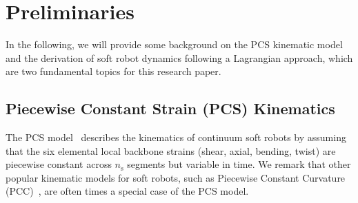 \section{Preliminaries}
In the following, we will provide some background on the \gls{PCS} kinematic model and the derivation of soft robot dynamics following a Lagrangian approach, which are two fundamental topics for this research paper.

\subsection{Piecewise Constant Strain (PCS) Kinematics}\label{sec:pcsregression:pcs_model}
The \gls{PCS} model~\citep{renda2018discrete} describes the kinematics of continuum soft robots by assuming that the six elemental local backbone strains (shear, axial, bending, twist) are piecewise constant across $n_\mathrm{s}$ segments but variable in time.
We remark that other popular kinematic models for soft robots, such as Piecewise Constant Curvature (PCC)~\citep{webster2010design}, are often times a special case of the \gls{PCS} model.

